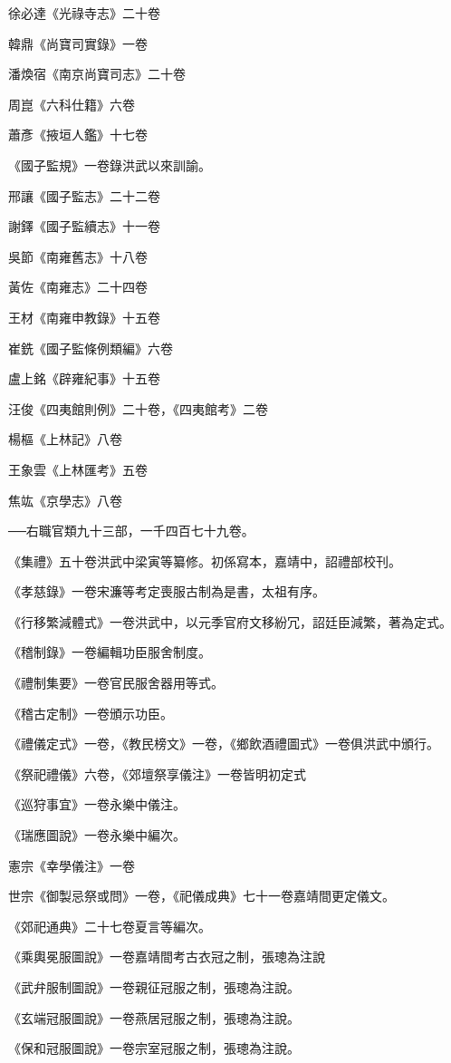 徐必達《光祿寺志》二十卷

韓鼎《尚寶司實錄》一卷

潘煥宿《南京尚寶司志》二十卷

周崑《六科仕籍》六卷

蕭彥《掖垣人鑑》十七卷

《國子監規》一卷錄洪武以來訓諭。

邢讓《國子監志》二十二卷

謝鐸《國子監續志》十一卷

吳節《南雍舊志》十八卷

黃佐《南雍志》二十四卷

王材《南雍申教錄》十五卷

崔銑《國子監條例類編》六卷

盧上銘《辟雍紀事》十五卷

汪俊《四夷館則例》二十卷，《四夷館考》二卷

楊樞《上林記》八卷

王象雲《上林匯考》五卷

焦竑《京學志》八卷

──右職官類九十三部，一千四百七十九卷。

《集禮》五十卷洪武中梁寅等纂修。初係寫本，嘉靖中，詔禮部校刊。

《孝慈錄》一卷宋濂等考定喪服古制為是書，太祖有序。

《行移繁減體式》一卷洪武中，以元季官府文移紛冗，詔廷臣減繁，著為定式。

《稽制錄》一卷編輯功臣服舍制度。

《禮制集要》一卷官民服舍器用等式。

《稽古定制》一卷頒示功臣。

《禮儀定式》一卷，《教民榜文》一卷，《鄉飲酒禮圖式》一卷俱洪武中頒行。

《祭祀禮儀》六卷，《郊壇祭享儀注》一卷皆明初定式

《巡狩事宜》一卷永樂中儀注。

《瑞應圖說》一卷永樂中編次。

憲宗《幸學儀注》一卷

世宗《御製忌祭或問》一卷，《祀儀成典》七十一卷嘉靖間更定儀文。

《郊祀通典》二十七卷夏言等編次。

《乘輿冕服圖說》一卷嘉靖間考古衣冠之制，張璁為注說

《武弁服制圖說》一卷親征冠服之制，張璁為注說。

《玄端冠服圖說》一卷燕居冠服之制，張璁為注說。

《保和冠服圖說》一卷宗室冠服之制，張璁為注說。

